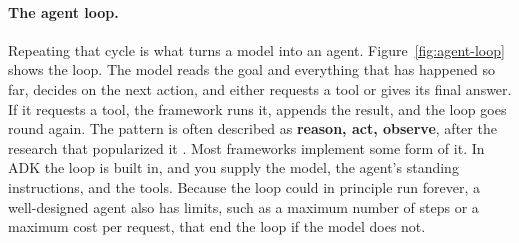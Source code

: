 \paragraph{The agent loop.} Repeating that cycle is what turns a model into an agent. Figure~\ref{fig:agent-loop} shows the loop. The model reads the goal and everything that has happened so far, decides on the next action, and either requests a tool or gives its final answer. If it requests a tool, the framework runs it, appends the result, and the loop goes round again. The pattern is often described as \textbf{reason, act, observe}, after the research that popularized it \citep{yao2023react}. Most frameworks implement some form of it. In ADK the loop is built in, and you supply the model, the agent's standing instructions, and the tools. Because the loop could in principle run forever, a well-designed agent also has limits, such as a maximum number of steps or a maximum cost per request, that end the loop if the model does not.

